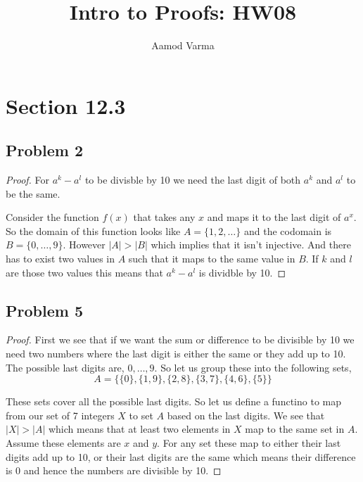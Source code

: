 \documentclass[a4paper]{report}
\title{Intro to Proofs: HW08}
\author{Aamod Varma}
\begin{document}
\maketitle
\date{}

\section*{Section 12.3}
\subsection*{Problem 2}
\begin{proof}
For $a^{k}- a^{l}$ to be divisble by 10 we need the last digit of both $a^{k}$ and $a^{l}$ to be the same.

Consider the function $f(x)$ that takes any $x$ and maps it to the last digit of $a^{x}$. So the domain of this function looks like $A = \{1,2,\dots\}$ and the codomain is $B = \{0,\dots,9\}$. However $|A| > |B|$ which implies that it isn't injective. And there has to exist two values in $A$ such that  it maps to the same value in $B$. If $k$ and $l$ are those two values this means that $a^{k}- a^{l}$ is dividble by 10.
\end{proof}


\subsection*{Problem 5}
\begin{proof}
    First we see that if we want the sum or difference to be divisible by 10 we need two numbers where the last digit is either the same or they add up to 10. The possible last digits are, $0,\dots,9$. So let us group these into the following sets, 
    $$A = \{ \{0\},\{1,9\},\{2,8\},\{3,7\},\{4,6\},\{5\} \}$$ 

    These sets cover all the possible last digits. So let us define a functino to map from our set of 7 integers $X$ to set $A$ based on the last digits. We see that $|X| > |A|$ which means that at least two elements in $X$ map to the same set in $A$. Assume these elements are  $x$ and $y$. For any set these map to either their last digits add up to 10, or their last digits are the same which means their difference is 0 and hence the numbers are divisible by 10.
\end{proof}
\end{document}

